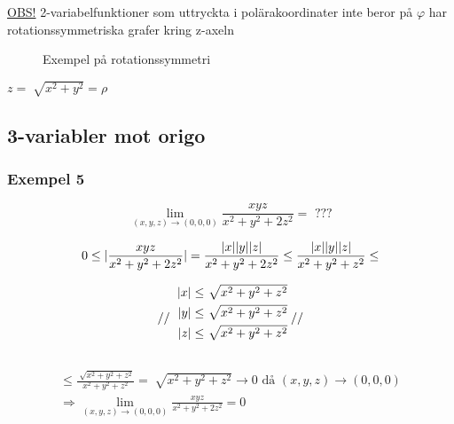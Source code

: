\documentclass{article}
\DeclarePairedDelimiter \abs{\lvert}{\rvert}
\let\oldsqrt\sqrt
\renewcommand*{\sqrt}[2][\ ]{\oldsqrt[#1]{#2} }
\begin{document}
\underline{OBS!} 2-variabelfunktioner som uttryckta i polärakoordinater inte beror på $\varphi$ har rotationssymmetriska grafer kring z-axeln

\begin{figure}[ht]
\usetikzlibrary{3d}
\caption{Exempel på rotationssymmetri} \label{fig:2.3}
\end{figure}

\(
z = \sqrt{x^2+y^2} = \rho
\)

\subsection{3-variabler mot origo}
\subsubsection{Exempel 5} 

\begin{equation} \label{eq:2.5}
	\lim_{(x,y,z) \rightarrow (0,0,0)} \frac{xyz}{x^2+y^2+2z^2} = \text{ ???}
\end{equation}

\[
	0 \leq \abs{\frac{xyz}{x^2+y^2+2z^2}} = \frac{\abs{x}\abs{y}\abs{z}}{x^2+y^2+2z^2} \leq \frac{\abs{x}\abs{y}\abs{z}}{x^2+y^2+z^2} \leq 
\]

\[
	// 
	\def\arraystretch{1.1}
	\begin{blockarray}{r@{\;}l}
	\abs{x} \leq \sqrt{x^2+y^2+z^2} \\ [\jot]
	\abs{y} \leq \sqrt{x^2+y^2+z^2} \\ [\jot]
	\abs{z} \leq \sqrt{x^2+y^2+z^2}
	\end{blockarray}
	//
\]

\[
\begin{split}
	\leq \frac{\sqrt{x^2+y^2+z^2}}{x^2+y^2+z^2} = \sqrt{x^2+y^2+z^2} \rightarrow 0 \text{ då } (x,y,z) \rightarrow (0,0,0) \\
	\Rightarrow \lim_{(x,y,z) \rightarrow (0,0,0)} \frac{xyz}{x^2+y^2+2z^2} = 0
\end{split}
\]
\end{document}
